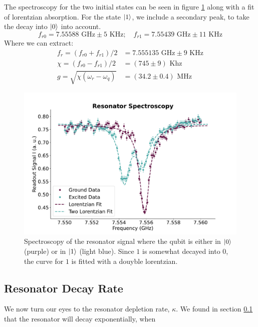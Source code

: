  The spectroscopy for the two initial states can be seen in figure \ref{fig:spectroscopy_resonator} along with a fit of lorentzian absorption. For the state $\ket{1}$, we include a secondary peak, to take the decay into $\ket{0}$ into account.
 \begin{equation}
     f_{r0} = 7.55588 \text{ GHz} \pm 5 \text{ KHz} ;\quad f_{r1} =  7.55439 \text{ GHz} \pm 11 \text{ KHz}
 \end{equation}
Where we can extract:
\begin{align}
    f_r  = (f_{r0} + f_{r1}) / 2 &= 7.555135 \text{ GHz} \pm 9 \text{ KHz} \\
    \chi = (f_{r0} - f_{r1}) / 2 &= (745 \pm 9) \text{ Khz} \\
    g    = \sqrt{\chi (\omega_r - \omega_q)} &= (34.2 \pm 0.4) \text{ MHz}
\end{align}

\begin{figure}
    \centering
    \includegraphics{Calibrations/Figures/Resonator Spectroscopy.pdf}
    \caption{Spectroscopy of the resonator signal where the qubit is either in $\ket{0}$ (purple) or in $\ket{1}$ (light blue). Since $1$ is somewhat decayed into $0$, the curve for $1$ is fitted with a douyble lorentzian. }
    \label{fig:spectroscopy_resonator}
\end{figure}

\subsection{Resonator Decay Rate}
We now turn our eyes to the resonator depletion rate, $\kappa$. We found in section \ref{} that the resonator will decay exponentially, when 

